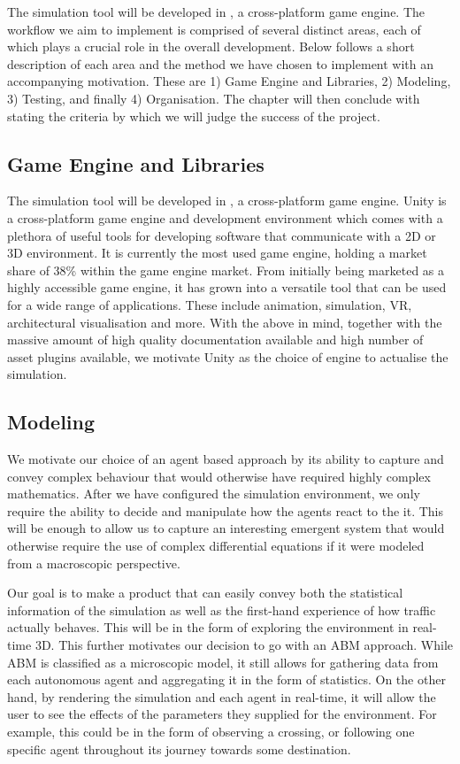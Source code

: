 The simulation tool will be developed in , a cross-platform game engine. The workflow we aim to implement is comprised of several distinct areas, each of which plays a crucial role in the overall development. Below follows a short description of each area and the method we have chosen to implement with an accompanying motivation. These are 1) Game Engine and Libraries, 2) Modeling, 3) Testing, and finally 4) Organisation. The chapter will then conclude with stating the criteria by which we will judge the success of the project. 

\subsection{Game Engine and Libraries}
    The simulation tool will be developed in , a cross-platform game engine.
    Unity is a cross-platform game engine and development environment which comes with a plethora of useful tools for developing software that communicate with a 2D or 3D environment. It is currently the most used game engine, holding a market share of 38\% within the game engine market\cite{unity-market-share}. From initially being marketed as a highly accessible game engine, it has grown into a versatile tool that can be used for a wide range of applications. These include animation, simulation, VR, architectural visualisation and more. With the above in mind, together with the massive amount of high quality documentation available and high number of asset plugins available, we motivate Unity as the choice of engine to actualise the simulation.

\subsection{Modeling}
    We motivate our choice of an agent based approach by its ability to capture and convey complex behaviour that would otherwise have required highly complex mathematics. After we have configured the simulation environment, we only require the ability to decide and manipulate how the agents react to the it. This will be enough to allow us to capture an interesting emergent system that would otherwise require the use of complex differential equations if it were modeled from a macroscopic perspective.

    Our goal is to make a product that can easily convey both the statistical information of the simulation as well as the first-hand experience of how traffic actually behaves. This will be in the form of exploring the environment in real-time 3D. This further motivates our decision to go with an ABM approach. While ABM is classified as a microscopic model, it still allows for gathering data from each autonomous agent and aggregating it in the form of statistics. On the other hand, by rendering the simulation and each agent in real-time, it will allow the user to see the effects of the parameters they supplied for the environment. For example, this could be in the form of observing a crossing, or following one specific agent throughout its journey towards some destination.

